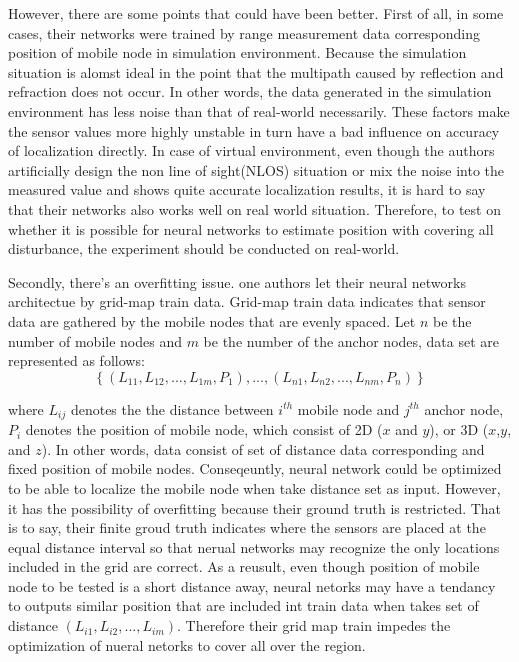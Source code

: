 \documentclass{ieeeaccess}
\begin{document}
However, there are some points that could have been better. First of all, in some cases, their networks were trained by range measurement data corresponding position of mobile node in simulation environment\cite{chatterjee2010fletcher, shareef2008localization, rahman2009localization, singh2013tdoa, banihashemian2018new}. Because the simulation situation is alomst ideal in the point that the multipath caused by reflection and refraction does not occur. In other words, the data generated in the simulation environment has less noise than that of real-world necessarily. These factors make the sensor values more highly unstable in turn have a bad influence on accuracy of localization directly. In case of virtual environment, even though the authors artificially design the non line of sight(NLOS) situation or mix the noise into the measured value and shows quite accurate localization results, it is hard to say that their networks also works well on real world situation. Therefore, to test on whether it is possible for neural networks to estimate position with covering all disturbance, the experiment should be conducted on real-world. 

Secondly, there's an overfitting issue. one authors let their neural networks architectue by grid-map train data. Grid-map train data indicates that sensor data are gathered by the mobile nodes that are evenly spaced. 
Let $n$ be the number of mobile nodes and $m$ be the number of the anchor nodes, data set are represented as follows: 
\begin{equation}
\left\{(L_{11}, L_{12}, ..., L_{1m}, P_1),...,(L_{n1}, L_{n2}, ..., L_{nm}, P_n)\right\}
\end{equation} 

where $L_{ij}$ denotes the the distance between $i^{th}$ mobile node and $j^{th}$ anchor node, $P_i$ denotes the position of mobile node, which consist of 2D ($x$ and $y$), or 3D ($x$,$y$, and $z$). In other words, data consist of set of distance data corresponding and fixed position of mobile nodes. Conseqeuntly, neural network  could be optimized to be able to localize the mobile node when take distance set as input. However, it has the possibility of overfitting because their ground truth is restricted. That is to say, their finite groud truth indicates where the sensors are placed at the equal distance interval so that nerual networks may recognize the only locations included in the grid are correct. As a reusult,  even though position of mobile node to be tested is a short distance away, neural netorks may have a tendancy to outputs similar position that are included int train data when takes set of distance $(L_{i1}, L_{i2}, ..., L_{im})$. Therefore their grid map train impedes the optimization of nueral netorks to cover all over the region.
\end{document}
